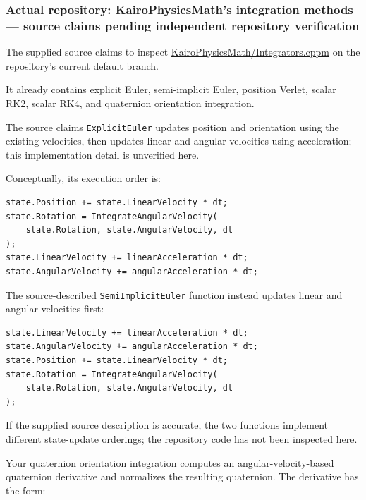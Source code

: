 \subsubsection{Actual repository: KairoPhysicsMath's integration methods --- source claims pending independent repository verification}\label{02-foundations-ii-ch025-actual-repository-kairophysicsmaths-integration-methods-source-claims-pending-independent-repository-verification}

\hypertarget{02-foundations-ii-ch025-actual-repository-kairophysicsmaths-integration-methods-source-claims-pending-independent-repository-verification}{}

The supplied source claims to inspect \href{https://github.com/swayam8624/KairoPhysicsMath/blob/main/Integrators.cppm?utm_source=chatgpt.com}{KairoPhysicsMath/Integrators.cppm} on the repository's current default branch.

It already contains explicit Euler, semi-implicit Euler, position Verlet, scalar RK2, scalar RK4, and quaternion orientation integration.

The source claims \texttt{ExplicitEuler} updates position and orientation using the existing velocities, then updates linear and angular velocities using acceleration; this implementation detail is unverified here.

Conceptually, its execution order is:

\begin{verbatim}
state.Position += state.LinearVelocity * dt;
state.Rotation = IntegrateAngularVelocity(
    state.Rotation, state.AngularVelocity, dt
);
state.LinearVelocity += linearAcceleration * dt;
state.AngularVelocity += angularAcceleration * dt;
\end{verbatim}

The source-described \texttt{SemiImplicitEuler} function instead updates linear and angular velocities first:

\begin{verbatim}
state.LinearVelocity += linearAcceleration * dt;
state.AngularVelocity += angularAcceleration * dt;
state.Position += state.LinearVelocity * dt;
state.Rotation = IntegrateAngularVelocity(
    state.Rotation, state.AngularVelocity, dt
);
\end{verbatim}

If the supplied source description is accurate, the two functions implement different state-update orderings; the repository code has not been inspected here.

Your quaternion orientation integration computes an angular-velocity-based quaternion derivative and normalizes the resulting quaternion. The derivative has the form:

